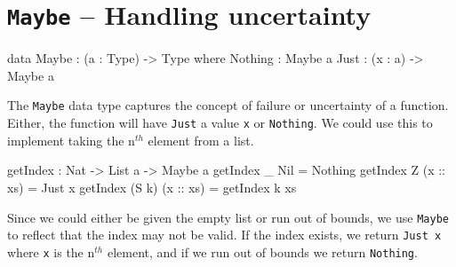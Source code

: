 \section{\texttt{Maybe} -- Handling uncertainty}\label{idris:maybe}
    \begin{code}[caption={The \texttt{Maybe} data type}]
        data Maybe : (a : Type) -> Type where
            Nothing : Maybe a
            Just : (x : a) -> Maybe a
    \end{code}

    The \texttt{Maybe} data type captures the concept of failure or uncertainty of a function. Either, the function will have \texttt{Just} a value \texttt{x} or \texttt{Nothing}. We could use this to implement taking the n$^{th}$ element from a list.
    \begin{code}[caption={List indexing using \texttt{Maybe}}]
        getIndex : Nat -> List a -> Maybe a
        getIndex _ Nil = Nothing
        getIndex Z (x :: xs) = Just x
        getIndex (S k) (x :: xs) = getIndex k xs
    \end{code}
    Since we could either be given the empty list or run out of bounds, we use \texttt{Maybe} to reflect that the index may not be valid. If the index exists, we return \texttt{Just x} where \texttt{x} is the n$^{th}$ element, and if we run out of bounds we return \texttt{Nothing}.
